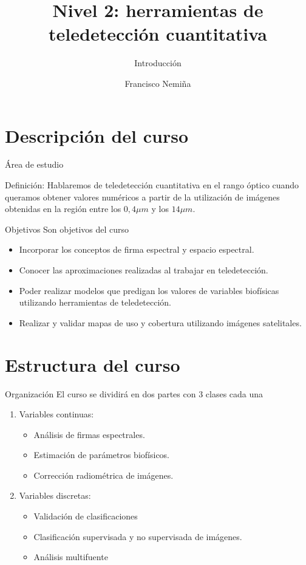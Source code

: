 \documentclass[]{beamer}
\author{Francisco Nemiña}
\title{Nivel 2: herramientas de teledetección cuantitativa}
\subtitle{Introducción}
\institute{Unidad de Educación y Formación Masiva \\ Comisión Nacional de Actividades Espaciales}
\date{}
\begin{document}
\maketitle
\section{Descripción del curso}

\begin{frame}{Área de estudio}
    \begin{block}{Definición:}
        Hablaremos de teledetección cuantitativa en el rango óptico cuando queramos obtener valores numéricos a partir de la utilización de imágenes obtenidas en la región entre los $0,4\mu m$ y los $14\mu m$.
    \end{block}
\end{frame}

\begin{frame}{Objetivos}
    Son objetivos del curso
    \begin{itemize}[<+->]
        \item Incorporar los conceptos de firma espectral y espacio espectral.
        \item Conocer las aproximaciones realizadas al trabajar en teledetección.
        \item Poder realizar modelos que predigan los valores de variables biofísicas utilizando herramientas de teledetección.
        \item Realizar y validar mapas de uso y cobertura utilizando imágenes satelitales.
    \end{itemize}
\end{frame}

\section{Estructura del curso}
\begin{frame}{Organización}
    El curso se dividirá en dos partes con 3 clases cada una
    \begin{enumerate}[<+->]
        \item Variables continuas:
        \begin{itemize}[<+->]
            \item Análisis de firmas espectrales.
            \item Estimación de parámetros biofísicos.
            \item Corrección radiométrica de imágenes.
        \end{itemize}
        \item Variables discretas:
        \begin{itemize}[<+->]
            \item Validación de clasificaciones
            \item Clasificación supervisada y no supervisada de imágenes.
            \item Análisis multifuente
        \end{itemize}
    \end{enumerate}
\end{frame}
\end{document}
